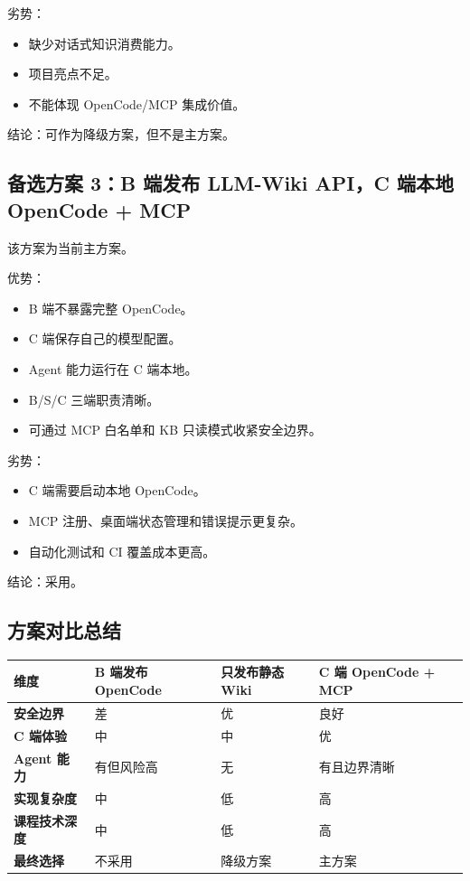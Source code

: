 \documentclass[UTF8,a4paper,12pt,fontset=fandol]{ctexart}
\begin{document}
劣势：
\begin{itemize}
  \item 缺少对话式知识消费能力。
  \item 项目亮点不足。
  \item 不能体现 OpenCode/MCP 集成价值。
\end{itemize}

结论：可作为降级方案，但不是主方案。

\subsection{备选方案 3：B 端发布 LLM-Wiki API，C 端本地 OpenCode + MCP}
该方案为当前主方案。

优势：
\begin{itemize}
  \item B 端不暴露完整 OpenCode。
  \item C 端保存自己的模型配置。
  \item Agent 能力运行在 C 端本地。
  \item B/S/C 三端职责清晰。
  \item 可通过 MCP 白名单和 KB 只读模式收紧安全边界。
\end{itemize}

劣势：
\begin{itemize}
  \item C 端需要启动本地 OpenCode。
  \item MCP 注册、桌面端状态管理和错误提示更复杂。
  \item 自动化测试和 CI 覆盖成本更高。
\end{itemize}

结论：采用。

\subsection{方案对比总结}
\begin{longtable}{>{\bfseries}p{3.0cm}p{3.5cm}p{3.2cm}p{4.0cm}}
\toprule
维度 & B 端发布 OpenCode & 只发布静态 Wiki & C 端 OpenCode + MCP \\
\midrule
安全边界 & 差 & 优 & 良好 \\
C 端体验 & 中 & 中 & 优 \\
Agent 能力 & 有但风险高 & 无 & 有且边界清晰 \\
实现复杂度 & 中 & 低 & 高 \\
课程技术深度 & 中 & 低 & 高 \\
最终选择 & 不采用 & 降级方案 & 主方案 \\
\bottomrule
\end{longtable}
\end{document}
